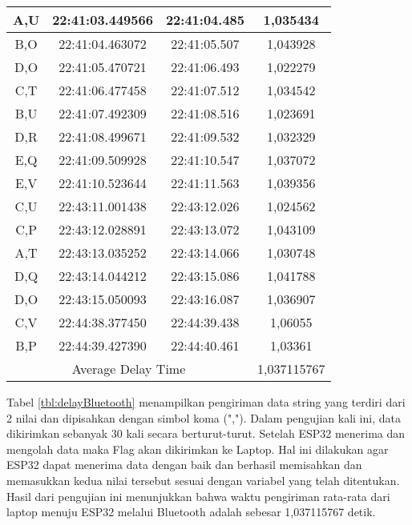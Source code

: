 \begin{table}[!ht]
\begin{tabular}{|ccc|c|}
  \multicolumn{1}{|c|}{A,U}  & \multicolumn{1}{c|}{22:41:03.449566} & 22:41:04.485       & 1,035434    \\ \hline
  \multicolumn{1}{|c|}{B,O}  & \multicolumn{1}{c|}{22:41:04.463072} & 22:41:05.507       & 1,043928    \\ \hline
  \multicolumn{1}{|c|}{D,O}  & \multicolumn{1}{c|}{22:41:05.470721} & 22:41:06.493       & 1,022279    \\ \hline
  \multicolumn{1}{|c|}{C,T}  & \multicolumn{1}{c|}{22:41:06.477458} & 22:41:07.512       & 1,034542    \\ \hline
  \multicolumn{1}{|c|}{B,U}  & \multicolumn{1}{c|}{22:41:07.492309} & 22:41:08.516       & 1,023691    \\ \hline
  \multicolumn{1}{|c|}{D,R}  & \multicolumn{1}{c|}{22:41:08.499671} & 22:41:09.532       & 1,032329    \\ \hline
  \multicolumn{1}{|c|}{E,Q}  & \multicolumn{1}{c|}{22:41:09.509928} & 22:41:10.547       & 1,037072    \\ \hline
  \multicolumn{1}{|c|}{E,V}  & \multicolumn{1}{c|}{22:41:10.523644} & 22:41:11.563       & 1,039356    \\ \hline
  \multicolumn{1}{|c|}{C,U}  & \multicolumn{1}{c|}{22:43:11.001438} & 22:43:12.026       & 1,024562    \\ \hline
  \multicolumn{1}{|c|}{C,P}  & \multicolumn{1}{c|}{22:43:12.028891} & 22:43:13.072       & 1,043109    \\ \hline
  \multicolumn{1}{|c|}{A,T}  & \multicolumn{1}{c|}{22:43:13.035252} & 22:43:14.066       & 1,030748    \\ \hline
  \multicolumn{1}{|c|}{D,Q}  & \multicolumn{1}{c|}{22:43:14.044212} & 22:43:15.086       & 1,041788    \\ \hline
  \multicolumn{1}{|c|}{D,O}  & \multicolumn{1}{c|}{22:43:15.050093} & 22:43:16.087       & 1,036907    \\ \hline
  \multicolumn{1}{|c|}{C,V}  & \multicolumn{1}{c|}{22:44:38.377450} & 22:44:39.438       & 1,06055     \\ \hline
  \multicolumn{1}{|c|}{B,P}  & \multicolumn{1}{c|}{22:44:39.427390} & 22:44:40.461       & 1,03361     \\ \hline
  \multicolumn{3}{|c|}{Average Delay Time}                                               & 1,037115767 \\ \hline
  \end{tabular}
\end{table}

Tabel \ref{tbl:delayBluetooth} menampilkan pengiriman data string yang terdiri dari 2 nilai dan dipisahkan dengan simbol koma (","). Dalam pengujian kali ini, data dikirimkan sebanyak 30 kali secara berturut-turut. Setelah ESP32 menerima dan mengolah data maka Flag akan dikirimkan ke Laptop. Hal ini dilakukan agar ESP32 dapat menerima data dengan baik dan berhasil memisahkan dan memasukkan kedua nilai tersebut sesuai dengan variabel yang telah ditentukan. Hasil dari pengujian ini menunjukkan bahwa waktu pengiriman rata-rata dari laptop menuju ESP32 melalui Bluetooth adalah sebesar 1,037115767 detik.

